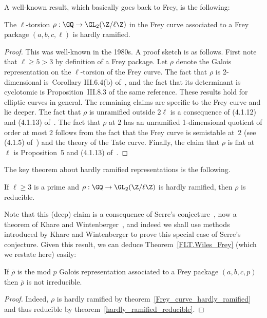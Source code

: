 A well-known result, which basically goes back to Frey, is the following:

\begin{theorem}
  \label{Frey_curve_hardly_ramified}
  The $\ell$-torsion $\rho:\GQ\to\GL_2(\Z/\ell\Z)$ in the Frey curve associated to a Frey
  package $(a,b,c,\ell)$ is hardly ramified.
\end{theorem}
\begin{proof}
  This was well-known in the 1980s. A proof sketch is as follows.
  First note that $\ell\geq5>3$ by definition of a Frey package. Let $\rho$
  denote the Galois representation on the $\ell$-torsion of the Frey curve.
  The fact that $\rho$ is 2-dimensional is~Corollary
  III.6.4(b) of~\cite{silverman1}, and the fact that its determinant is
  cyclotomic is Proposition~III.8.3 of the same reference. These results hold for elliptic curves
  in general. The remaining claims are specific to the Frey curve and lie
  deeper. The fact that $\rho$ is unramified outside $2\ell$ is a consequence
  of (4.1.12) and (4.1.13) of~\cite{serreconj}. The fact that $\rho$ at 2
  has an unramified 1-dimensional quotient of order at most 2 follows from
  the fact that the Frey curve is semistable at~2 (see (4.1.5) of~\cite{serreconj})
  and the theory of the Tate curve. Finally, the claim that $\rho$ is flat at $\ell$
  is Proposition~5 and (4.1.13) of~\cite{serreconj}.
\end{proof}

The key theorem about hardly ramified representations is the following.

\begin{theorem}
  \label{hardly_ramified_reducible}
  If $\ell\geq 3$ is a prime and $\rho:\GQ\to\GL_2(\Z/\ell\Z)$ is hardly ramified,
  then $\rho$ is reducible.
\end{theorem}

Note that this (deep) claim is a consequence of Serre's conjecture~\cite{serreconj},
now a theorem of Khare and Wintenberger~\cite{kwII}, and indeed we shall use
methods introduced by Khare and Wintenberger to prove this special case of
Serre's conjecture. Given this result, we can deduce Theorem~\ref{FLT.Wiles_Frey}
(which we restate here) easily:

\begin{theorem}
  \label{FLT.Wiles_Frey'}
  \leanok
  If $\overline{\rho}$ is the mod $p$ Galois representation associated to a Frey package $(a,b,c,p)$ then
  $\overline{\rho}$ is not irreducible.
\end{theorem}
\begin{proof}
  Indeed, $\rho$ is hardly ramified by theorem~\ref{Frey_curve_hardly_ramified}
  and thus reducible by theorem~\ref{hardly_ramified_reducible}.
\end{proof}

